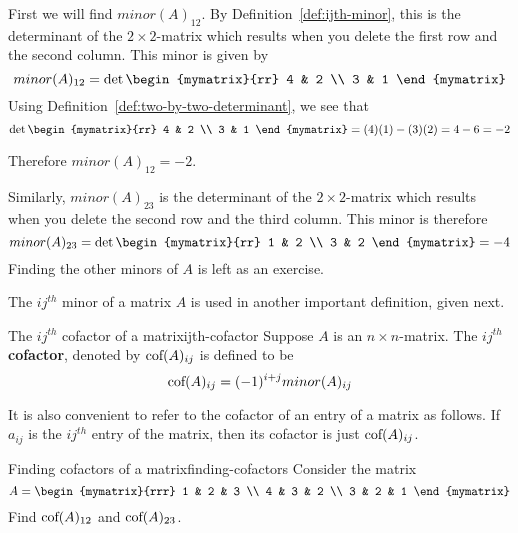 \begin{solution} First we will find $minor(A) _{12}$. By Definition~\ref{def:ijth-minor}, this is the determinant of the $2\times 2$-matrix
which results when you delete the first row and the second column. This
minor is given by
\begin{equation*}
minor (A)_{12}
=
\det \begin{mymatrix}{rr}
4 & 2 \\
3 & 1
\end{mymatrix}
\end{equation*}
Using Definition~\ref{def:two-by-two-determinant}, we see that 
\begin{equation*}
\det \begin{mymatrix}{rr}
4 & 2 \\
3 & 1
\end{mymatrix} = (4)(1) - (3)(2) = 4 - 6 = -2
\end{equation*}

Therefore $minor (A)_{12} = -2$. 

Similarly, $minor(A)_{23}$ is the determinant of the $2\times 2$-matrix
which results when you delete the second row and the third column. This
minor is therefore
\begin{equation*}
minor (A)_{23} 
=
\det \begin{mymatrix}{rr}
1 & 2 \\
3 & 2
\end{mymatrix} = -4
\end{equation*}
Finding the other minors of $A$ is left as an exercise. 
\end{solution}

The $ij^{th}$ minor of a matrix $A$ is used in another important definition, given next.

\begin{definition}{The $ij^{th}$ cofactor of a matrix}{ijth-cofactor}
Suppose $A$ is an $n\times n$-matrix. The $ij^{th}$ \textbf{cofactor}, denoted by $\mbox{\rm cof}(A) _{ij}$ is
defined to be 
\begin{equation*}
\mbox{\rm cof}(A) _{ij} = (-1) ^{i+j} minor(A)_{ij} 
\end{equation*}
\end{definition}

It is also convenient to refer to the
cofactor of an entry of a matrix as follows. If $a_{ij}$ is the $ij^{th}$ entry of the
matrix, then its cofactor is just $\mbox{\rm cof}(A) _{ij}$.

\begin{example}{Finding cofactors of a matrix}{finding-cofactors}
Consider the matrix
\begin{equation*}
A=\begin{mymatrix}{rrr}
1 & 2 & 3 \\
4 & 3 & 2 \\
3 & 2 & 1
\end{mymatrix} 
\end{equation*}
Find $\mbox{\rm cof}(A) _{12}$ and $\mbox{\rm cof}(A) _{23}$.
\end{example}

